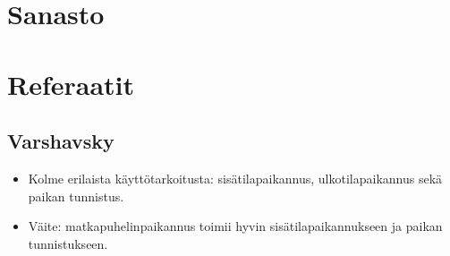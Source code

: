 \documentclass[a4paper]{scrartcl}
\begin{document}
\section{Sanasto}

\printglossaries

\section{Referaatit}

\subsection{Varshavsky \cite{varshavsky2005gsm}}
\begin{itemize}
  \item Kolme erilaista käyttötarkoitusta: sisätilapaikannus, ulkotilapaikannus
    sekä paikan tunnistus.
  \item Väite: matkapuhelinpaikannus toimii hyvin sisätilapaikannukseen ja
    paikan tunnistukseen.
\end{itemize}
\end{document}
